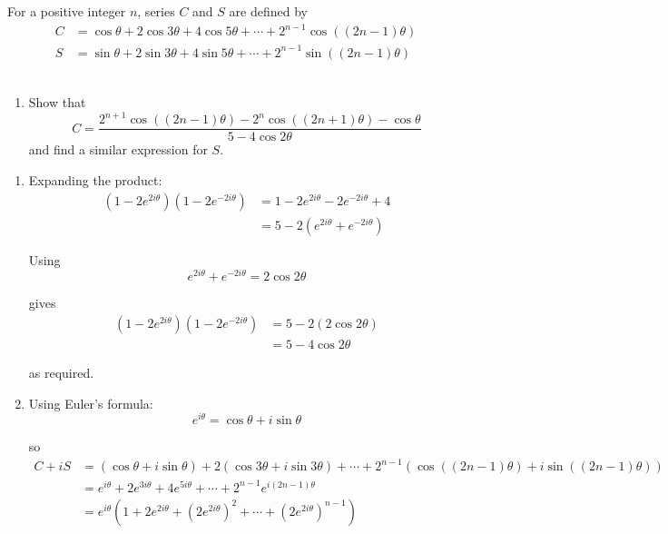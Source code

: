 \documentclass[leqno]{article}
\begin{document}
\begin{enumerate}[
  label=\textbf{\arabic*.},
  leftmargin=*,
  topsep=0pt,
  partopsep=0pt,
  parsep=0pt
]
For a positive integer $n$, series $C$ and $S$ are defined by\\

\[
\begin{aligned}
C &= \cos\theta + 2\cos 3\theta + 4\cos 5\theta + \cdots + 2^{n-1}\cos((2n-1)\theta)\\[5pt]
S &= \sin\theta + 2\sin 3\theta + 4\sin 5\theta + \cdots + 2^{n-1}\sin((2n-1)\theta)
\end{aligned}
\] \\
\begin{enumerate}[label=\textbf{(\roman*)}, resume]
  \item Show that
  \[
  C = \frac{2^{n+1}\cos((2n-1)\theta) - 2^n\cos((2n+1)\theta) - \cos\theta}{5 - 4\cos 2\theta}
  \]
  and find a similar expression for $S$. 
\end{enumerate}

\vspace*{10pt}

\begin{djsSolution}
\begin{enumerate}[label=\textbf{(\roman*)}]
  \item Expanding the product:
  \begin{align*}
  (1-2e^{2i\theta})(1-2e^{-2i\theta})
  &=1-2e^{2i\theta}-2e^{-2i\theta}+4\\
  &=5-2\left(e^{2i\theta}+e^{-2i\theta}\right)
  \end{align*}

  Using
  \[
  e^{2i\theta}+e^{-2i\theta}=2\cos 2\theta
  \]

  gives
  \begin{align*}
  (1-2e^{2i\theta})(1-2e^{-2i\theta})
  &=5-2(2\cos 2\theta)\\
  &=5-4\cos 2\theta
  \end{align*}

  as required.

  \item Using Euler's formula:
  \[
  e^{i\theta}=\cos\theta+i\sin\theta
  \]

  so
  \begin{align*}
  C+iS&=(\cos\theta+i\sin\theta)+2(\cos3\theta+i\sin3\theta)+\cdots+2^{n-1}(\cos((2n-1)\theta)+i\sin((2n-1)\theta))\\
  &=e^{i\theta}+2e^{3i\theta}+4e^{5i\theta}+\cdots+2^{n-1}e^{i(2n-1)\theta}\\
  &=e^{i\theta}\left(1+2e^{2i\theta}+(2e^{2i\theta})^2+\cdots+(2e^{2i\theta})^{n-1}\right)
  \end{align*}


\end{enumerate}
\end{djsSolution}
\end{enumerate}
\end{document}
